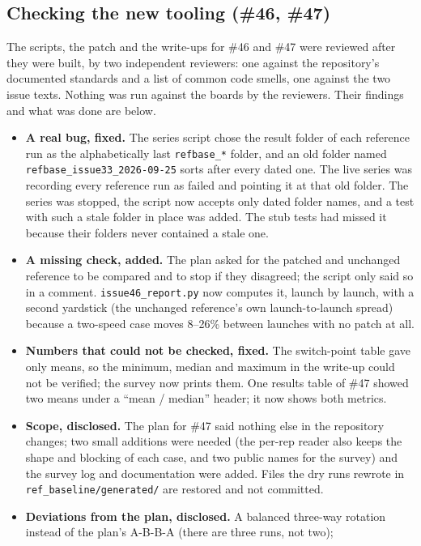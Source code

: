 \documentclass[11pt,a4paper]{article}
\begin{document}
\subsection{Checking the new tooling (\#46, \#47)}
\label{sec:review}
The scripts, the patch and the write-ups for \#46 and \#47 were reviewed after they were built, by two independent reviewers: one
against the repository's documented standards and a list of common code smells, one against the two issue texts. Nothing was
run against the boards by the reviewers. Their findings and what was done are below.
\begin{itemize}
  \item \textbf{A real bug, fixed.} The series script chose the result folder of each reference run as the alphabetically last
  \texttt{refbase\_*} folder, and an old folder named \texttt{refbase\_issue33\_2026-09-25} sorts after every dated one. The live
  series was recording every reference run as failed and pointing it at that old folder. The series was stopped, the script now
  accepts only dated folder names, and a test with such a stale folder in place was added. The stub tests had missed it because their
  folders never contained a stale one.
  \item \textbf{A missing check, added.} The plan asked for the patched and unchanged reference to be compared and to stop if they
  disagreed; the script only said so in a comment. \texttt{issue46\_report.py} now computes it, launch by launch, with a second
  yardstick (the unchanged reference's own launch-to-launch spread) because a two-speed case moves 8--26\% between launches with no patch at all.
  \item \textbf{Numbers that could not be checked, fixed.} The switch-point table gave only means, so the minimum, median and maximum in the
  write-up could not be verified; the survey now prints them. One results table of \#47 showed two means under a ``mean / median'' header;
  it now shows both metrics.
  \item \textbf{Scope, disclosed.} The plan for \#47 said nothing else in the repository changes; two small additions were needed (the per-rep
  reader also keeps the shape and blocking of each case, and two public names for the survey) and the survey log and documentation were added.
  Files the dry runs rewrote in \texttt{ref\_baseline/generated/} are restored and not committed.
  \item \textbf{Deviations from the plan, disclosed.} A balanced three-way rotation instead of the plan's A-B-B-A (there are three runs, not two);

\end{itemize}
\end{document}
